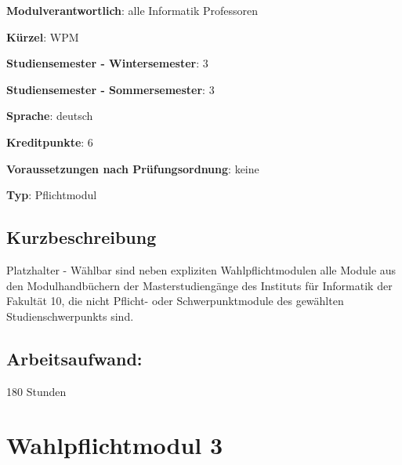 \begin{modulHead}
\textbf{Modulverantwortlich}: alle Informatik
Professoren
\end{modulHead}
\begin{modulHead}
\textbf{Kürzel}:
WPM
\end{modulHead}
\begin{modulHead}
\textbf{Studiensemester -
Wintersemester}:
3
\end{modulHead}
\begin{modulHead}
\textbf{Studiensemester -
Sommersemester}: 3
\end{modulHead}
\begin{modulHead}
\textbf{Sprache}:
deutsch
\end{modulHead}
\begin{modulHead}
\textbf{Kreditpunkte}:
6
\end{modulHead}
\begin{modulHead}
\textbf{Voraussetzungen nach
Prüfungsordnung}: keine
\end{modulHead}
\begin{modulHead}
\textbf{Typ}:
Pflichtmodul
\end{modulHead}


\section*{Kurzbeschreibung}\label{kurzbeschreibung-5}

Platzhalter - Wählbar sind neben expliziten Wahlpflichtmodulen alle
Module aus den Modulhandbüchern der Masterstudiengänge des Instituts für
Informatik der Fakultät 10, die nicht Pflicht- oder Schwerpunktmodule
des gewählten Studienschwerpunkts sind.

\section*{Arbeitsaufwand:}\label{arbeitsaufwand-7}

180 Stunden

\chapter{Wahlpflichtmodul 3}\label{wahlpflichtmodul-3}

